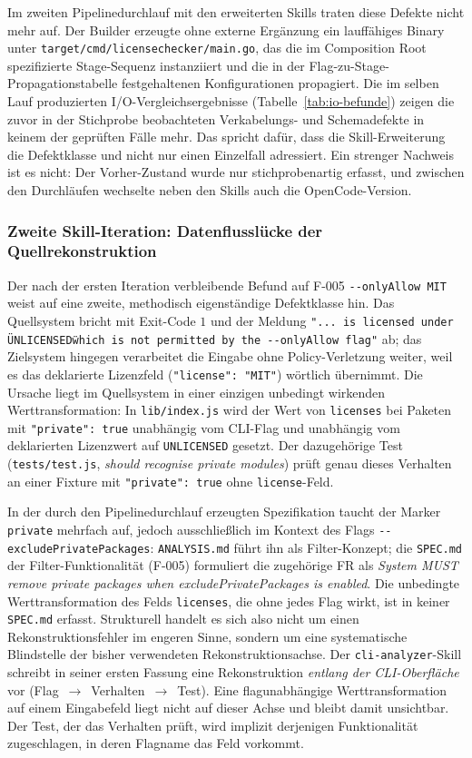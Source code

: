 Im zweiten Pipelinedurchlauf mit den erweiterten Skills traten diese Defekte nicht mehr auf. Der Builder erzeugte ohne externe Ergänzung ein lauffähiges Binary unter \texttt{target/cmd/licensechecker/main.go}, das die im Composition Root spezifizierte Stage-Sequenz instanziiert und die in der Flag-zu-Stage-Propagationstabelle festgehaltenen Konfigurationen propagiert. Die im selben Lauf produzierten I/O-Vergleichsergebnisse (Tabelle~\ref{tab:io-befunde}) zeigen die zuvor in der Stichprobe beobachteten Verkabelungs- und Schemadefekte in keinem der geprüften Fälle mehr. Das spricht dafür, dass die Skill-Erweiterung die Defektklasse und nicht nur einen Einzelfall adressiert. Ein strenger Nachweis ist es nicht: Der Vorher-Zustand wurde nur stichprobenartig erfasst, und zwischen den Durchläufen wechselte neben den Skills auch die OpenCode-Version.

\subsubsection{Zweite Skill-Iteration: Datenflusslücke der Quellrekonstruktion} \label{sec:datafluss-gap}

Der nach der ersten Iteration verbleibende Befund auf F-005 \texttt{-{}-onlyAllow MIT} weist auf eine zweite, methodisch eigenständige Defektklasse hin. Das Quellsystem bricht mit Exit-Code $1$ und der Meldung \texttt{"... is licensed under \"UNLICENSED\" which is not permitted by the -{}-onlyAllow flag"} ab; das Zielsystem hingegen verarbeitet die Eingabe ohne Policy-Verletzung weiter, weil es das deklarierte Lizenzfeld (\texttt{"license": "MIT"}) wörtlich übernimmt. Die Ursache liegt im Quellsystem in einer einzigen unbedingt wirkenden Werttransformation: In \texttt{lib/index.js} wird der Wert von \texttt{licenses} bei Paketen mit \texttt{"private": true} unabhängig vom CLI-Flag und unabhängig vom deklarierten Lizenzwert auf \texttt{UNLICENSED} gesetzt. Der dazugehörige Test (\texttt{tests/test.js}, \emph{should recognise private modules}) prüft genau dieses Verhalten an einer Fixture mit \texttt{"private": true} ohne \texttt{license}-Feld.

In der durch den Pipelinedurchlauf erzeugten Spezifikation taucht der Marker \texttt{private} mehrfach auf, jedoch ausschließlich im Kontext des Flags \texttt{-{}-excludePrivatePackages}: \texttt{ANALYSIS.md} führt ihn als Filter-Konzept; die \texttt{SPEC.md} der Filter-Funktionalität (F-005) formuliert die zugehörige FR als \emph{System MUST remove private packages when excludePrivatePackages is enabled}. Die unbedingte Werttransformation des Felds \texttt{licenses}, die ohne jedes Flag wirkt, ist in keiner \texttt{SPEC.md} erfasst. Strukturell handelt es sich also nicht um einen Rekonstruktionsfehler im engeren Sinne, sondern um eine systematische Blindstelle der bisher verwendeten Rekonstruktionsachse. Der \texttt{cli-analyzer}-Skill schreibt in seiner ersten Fassung eine Rekonstruktion \emph{entlang der CLI-Oberfläche} vor (Flag~$\rightarrow$~Verhalten~$\rightarrow$~Test). Eine flagunabhängige Werttransformation auf einem Eingabefeld liegt nicht auf dieser Achse und bleibt damit unsichtbar. Der Test, der das Verhalten prüft, wird implizit derjenigen Funktionalität zugeschlagen, in deren Flagname das Feld vorkommt.

